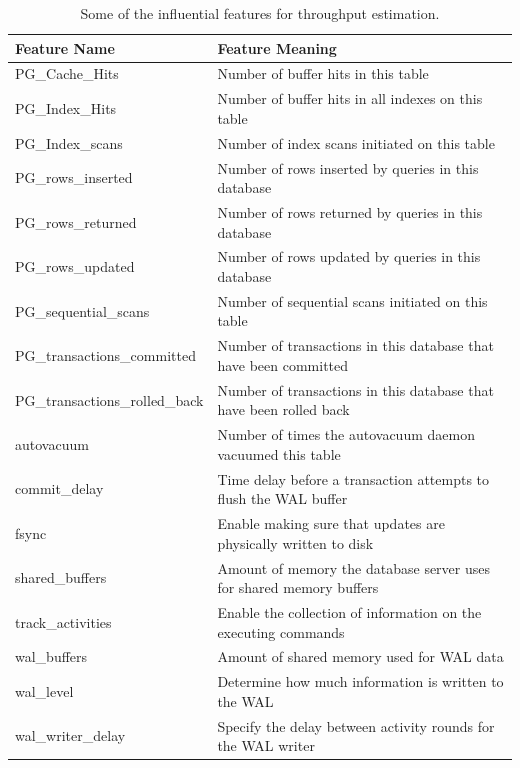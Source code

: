 \begin{table}[h!]
  \centering
  \begin{adjustbox}{max width=0.85\textwidth}
    \begin{tabular}{ll}
      \toprule
      Feature Name                   & Feature Meaning                                                     \\
      \midrule
      PG\_Cache\_Hits                & Number of buffer hits in this table                                 \\
      PG\_Index\_Hits                & Number of buffer hits in all indexes on this table                  \\
      PG\_Index\_scans               & Number of index scans initiated on this
      table                       \\
      PG\_rows\_inserted             & Number of rows inserted by queries in this database                 \\
      PG\_rows\_returned             & Number of rows returned by queries in this database                 \\
      PG\_rows\_updated              & Number of rows updated by queries in this database                  \\
      PG\_sequential\_scans          & Number of sequential scans initiated on this table                  \\
      PG\_transactions\_committed    & Number of transactions in this database that have been committed    \\
      PG\_transactions\_rolled\_back & Number of transactions in this database that have been rolled back  \\
      autovacuum                     & Number of times the autovacuum daemon vacuumed this table           \\
      commit\_delay                  & Time delay before a transaction attempts to flush the WAL buffer    \\
      fsync                          & Enable making sure that updates are physically written to disk      \\
      shared\_buffers                & Amount of memory the database server uses for shared memory buffers \\
      track\_activities              & Enable the collection of information on the executing commands      \\
      wal\_buffers                   & Amount of shared memory used for WAL data                           \\
      wal\_level                     & Determine how much information is written to the WAL                \\
      wal\_writer\_delay             & Specify the delay between activity rounds for the WAL writer        \\
      \bottomrule
    \end{tabular}
  \end{adjustbox}

  \caption{Some of the influential features for throughput estimation.}
  \label{tab:influential_features_for_throughput}
\end{table}

